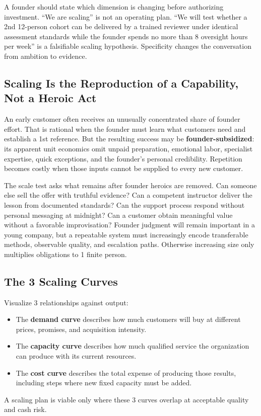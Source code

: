 A founder should state which dimension is changing before authorizing investment. ``We are scaling'' is not an operating plan. ``We will test whether a 2nd 12-person cohort can be delivered by a trained reviewer under identical assessment standards while the founder spends no more than 8 oversight hours per week'' is a falsifiable scaling hypothesis. Specificity changes the conversation from ambition to evidence.

\subsection{Scaling Is the Reproduction of a Capability, Not a Heroic Act}
\label{sec:scaling_reproduction_not_heroics}

An early customer often receives an unusually concentrated share of founder effort. That is rational when the founder must learn what customers need and establish a 1st reference. But the resulting success may be \textbf{founder-subsidized}: its apparent unit economics omit unpaid preparation, emotional labor, specialist expertise, quick exceptions, and the founder's personal credibility. Repetition becomes costly when those inputs cannot be supplied to every new customer.

The scale test asks what remains after founder heroics are removed. Can someone else sell the offer with truthful evidence? Can a competent instructor deliver the lesson from documented standards? Can the support process respond without personal messaging at midnight? Can a customer obtain meaningful value without a favorable improvisation? Founder judgment will remain important in a young company, but a repeatable system must increasingly encode transferable methods, observable quality, and escalation paths. Otherwise increasing size only multiplies obligations to 1 finite person.

\subsection{The 3 Scaling Curves}
\label{sec:three_scaling_curves}

Visualize 3 relationships against output:
\begin{itemize}
    \item The \textbf{demand curve} describes how much customers will buy at different prices, promises, and acquisition intensity.
    \item The \textbf{capacity curve} describes how much qualified service the organization can produce with its current resources.
    \item The \textbf{cost curve} describes the total expense of producing those results, including steps where new fixed capacity must be added.
\end{itemize}
A scaling plan is viable only where these 3 curves overlap at acceptable quality and cash risk.

